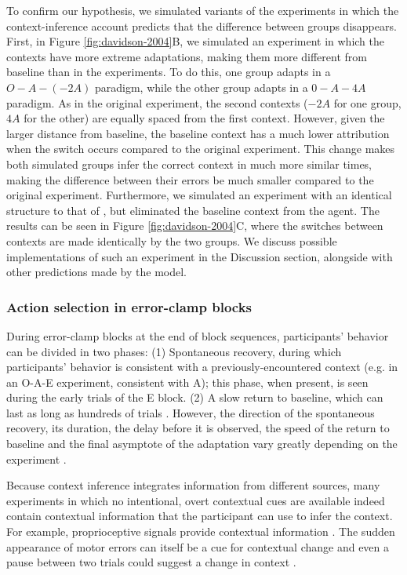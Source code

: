 \documentclass[a4paper,doc,floatsintext,natbib]{apa6}%
\def \fref #1{Figure \ref{#1}}     %
\begin{document}
To confirm our hypothesis, we simulated variants of the experiments in which the context-inference account predicts that the difference between groups disappears. First, in \fref{fig:davidson-2004}B, we simulated an experiment in which the contexts have more extreme adaptations, making them more different from baseline than in the \cite{Davidson_Scaling_2004} experiments. To do this, one group adapts in a $O-A-(-2A)$ paradigm, while the other group adapts in a $0-A-4A$ paradigm. As in the original experiment, the second contexts ($-2A$ for one group, $4A$ for the other) are equally spaced from the first context. However, given the larger distance from baseline, the baseline context has a much lower attribution when the switch occurs compared to the original experiment. This change makes both simulated groups infer the correct context in much more similar times, making the difference between their errors be much smaller compared to the original experiment. Furthermore, we simulated an experiment with an identical structure to that of \cite{Davidson_Scaling_2004}, but eliminated the baseline context from the agent. The results can be seen in \fref{fig:davidson-2004}C, where the switches between contexts are made identically by the two groups. We discuss possible implementations of such an experiment in the Discussion section, alongside with other predictions made by the model.  

\subsubsection{Action selection in error-clamp blocks}
During error-clamp blocks at the end of block sequences, participants' behavior can be divided in two phases: (1) Spontaneous recovery, during which participants' behavior is consistent with a previously-encountered context (e.g. in an O-A-E experiment, consistent with A); this phase, when present, is seen during the early trials of the E block. (2) A slow return to baseline, which can last as long as hundreds of trials \citep{Brennan_Decay_2015}. However, the direction of the spontaneous recovery, its duration, the delay before it is observed, the speed of the return to baseline and the final asymptote of the adaptation vary greatly depending on the experiment \citep{Brennan_Decay_2015,Vaswani_Decay_2013,Smith_Interacting_2006,Shmuelof_Overcoming_2012}.

Because context inference integrates information from different sources, many experiments in which no intentional, overt contextual cues are available indeed contain contextual information that the participant can use to infer the context. For example, proprioceptive signals  provide contextual information \citep{Dizio_Motor_1995,Shadmehr_Adaptive_1994}. The sudden appearance of motor errors can itself be a cue for contextual change \citep{Herzfeld_memory_2014} and even a pause between two trials could suggest a change in context \cite{Ethier_Spontaneous_2008}.
\end{document}
